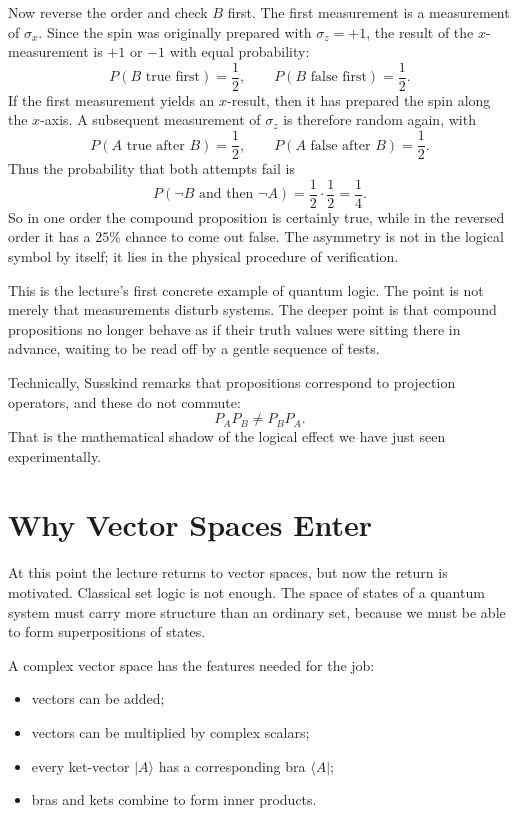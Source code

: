 Now reverse the order and check \(B\) first. The first measurement is a measurement of \(\sigma_x\). Since the spin was originally prepared with \(\sigma_z=+1\), the result of the \(x\)-measurement is \(+1\) or \(-1\) with equal probability:
\[
P(B\text{ true first})=\frac12,\qquad P(B\text{ false first})=\frac12.
\]
If the first measurement yields an \(x\)-result, then it has prepared the spin along the \(x\)-axis. A subsequent measurement of \(\sigma_z\) is therefore random again, with
\[
P(A\text{ true after }B)=\frac12,\qquad P(A\text{ false after }B)=\frac12.
\]
Thus the probability that both attempts fail is
\begin{equation}
P(\neg B\text{ and then }\neg A)=\frac12\cdot\frac12=\frac14.
\end{equation}
So in one order the compound proposition is certainly true, while in the reversed order it has a \(25\%\) chance to come out false. The asymmetry is not in the logical symbol by itself; it lies in the physical procedure of verification.

This is the lecture's first concrete example of quantum logic. The point is not merely that measurements disturb systems. The deeper point is that compound propositions no longer behave as if their truth values were sitting there in advance, waiting to be read off by a gentle sequence of tests.

Technically, Susskind remarks that propositions correspond to projection operators, and these do not commute:
\begin{equation}
P_A P_B \neq P_B P_A.
\end{equation}
That is the mathematical shadow of the logical effect we have just seen experimentally.

\section{Why Vector Spaces Enter}

At this point the lecture returns to vector spaces, but now the return is motivated. Classical set logic is not enough. The space of states of a quantum system must carry more structure than an ordinary set, because we must be able to form superpositions of states.

A complex vector space has the features needed for the job:
\begin{itemize}
\item vectors can be added;
\item vectors can be multiplied by complex scalars;
\item every ket-vector \(|A\rangle\) has a corresponding bra \(\langle A|\);
\item bras and kets combine to form inner products.
\end{itemize}


